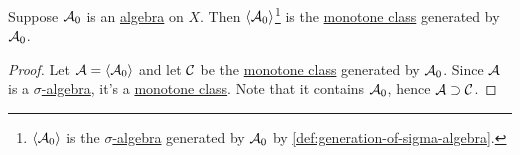 \begin{theorem}\label{thm:monotone-class-lemma}
	Suppose \(\mathcal{\MakeUppercase{a}} _0\) is an \hyperref[def:algebra]{algebra} on \(X\). Then \(\left< \mathcal{\MakeUppercase{a}} _0 \right>\)\footnote{\(\left< \mathcal{\MakeUppercase{a}} _0 \right> \) is
		the \hyperref[def:sigma-algebra]{\(\sigma\)-algebra} generated by \(\mathcal{\MakeUppercase{a}} _0\) by \autoref{def:generation-of-sigma-algebra}.}
	is the \hyperref[def:monotone-class]{monotone class} generated by \(\mathcal{\MakeUppercase{a}} _0\).
\end{theorem}
\begin{proof}
	Let \(\mathcal{\MakeUppercase{a}}  = \left< \mathcal{\MakeUppercase{a}} _0 \right> \) and let \(\mathcal{\MakeUppercase{C}} \) be the \hyperref[def:monotone-class]{monotone class}
	generated by \(\mathcal{\MakeUppercase{a}} _0\). Since \(\mathcal{\MakeUppercase{a}} \) is a \hyperref[def:sigma-algebra]{\(\sigma\)-algebra}, it's a
	\hyperref[def:monotone-class]{monotone class}. Note that it contains \(\mathcal{\MakeUppercase{a}} _0\), hence \(\mathcal{\MakeUppercase{a}} \supset \mathcal{\MakeUppercase{C}} \).


\end{proof}
